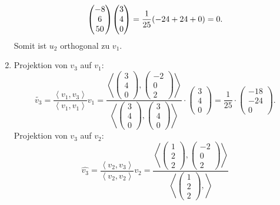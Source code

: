 \documentclass[german,12pt]{homework}
\newcommand{\dotproduct}[2]{\left\langle#1, #2\right\rangle}
\DeclarePairedDelimiter{\enbrace}{(}{)}
\begin{document}
\begin{enumerate}
\[{        \begin{pmatrix}-8\\6\\50\end{pmatrix}}{\begin{pmatrix}3\\4\\0
        \end{pmatrix}} = \frac{1}{25}\enbrace*{-24 + 24 + 0} = 0.\]
        Somit ist \(u_2\) orthogonal zu \(v_1\).
        \item Projektion von \(v_3\) auf \(v_1\):
        \[\tilde{v_3} = \frac{\dotproduct{v_1}{v_3}}{\dotproduct{v_1}{v_1}}v_1 =
        \frac{\dotproduct{\begin{pmatrix}3\\4\\0\end{pmatrix}}{\begin{pmatrix}
        -2\\0\\2\end{pmatrix}}}{\dotproduct{\begin{pmatrix}3\\4\\0\end{pmatrix}}
        {\begin{pmatrix}3\\4\\0\end{pmatrix}}} \cdot
        \begin{pmatrix}3\\4\\0\end{pmatrix} = \frac{1}{25} \cdot
        \begin{pmatrix}-18\\-24\\0\end{pmatrix}.\]
        Projektion von \(v_3\) auf \(v_2\):
        \[\hat{v_3} = \frac{\dotproduct{v_2}{v_3}}{\dotproduct{v_2}{v_2}}v_2 =
        \frac{\dotproduct{\begin{pmatrix}1\\2\\2\end{pmatrix}}{\begin{pmatrix}-2
        \\0\\2\end{pmatrix}}}{\dotproduct{\begin{pmatrix}1\\2\\2\end{pmatrix}}{
}}\]
\end{enumerate}
\end{document}
